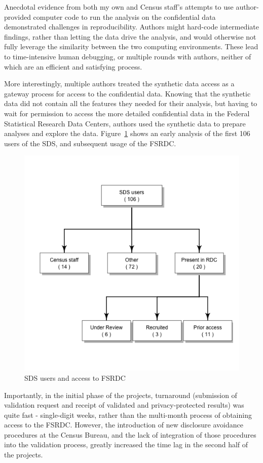 \documentclass[]{hdsr}
\begin{document}
Anecdotal evidence from both my own and Census staff's attempts to use author-provided computer code to run the analysis on the confidential data demonstrated challenges in reproducibility. Authors might hard-code intermediate findings, rather than letting the data drive the analysis, and would otherwise not fully leverage the similarity between the two computing environments. These lead to time-intensive human debugging, or multiple rounds with authors, neither of which are an efficient and satisfying process. 

More interestingly, multiple authors treated the synthetic data access as a gateway process for access to the confidential data. Knowing that the synthetic data did not contain all the features they needed for their analysis, but having to wait for permission to access the more detailed confidential data in the Federal Statistical Research Data Centers, authors used the synthetic data to prepare analyses and explore the data. Figure~\ref{fig:useRDC} shows an early analysis of the first 106 users of the \ac{SDS}, and subsequent usage of the FSRDC. 

\begin{figure}
    \centering
    \includegraphics[width=0.5\linewidth]{figs/useRDCgraph.png}
    \caption{SDS users and access to FSRDC}
    \label{fig:useRDC}
\end{figure}

Importantly, in the initial phase of the projects, turnaround (submission of validation request and receipt of validated and privacy-protected results) was quite fast - single-digit weeks, rather than the multi-month process of obtaining access to the FSRDC. However, the introduction of new disclosure avoidance procedures at the Census Bureau, and the lack of integration of those procedures into the validation process, greatly increased the time lag in the second half of the projects.
\end{document}
